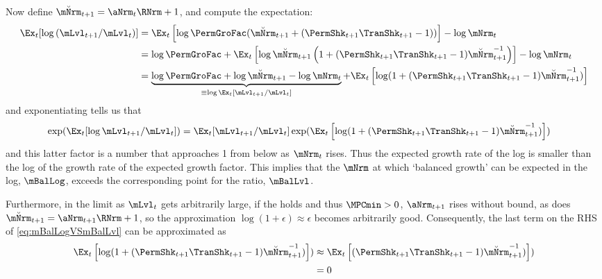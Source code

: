 \documentclass[\econtexRoot/BufferStockTheory]{subfiles}
\begin{document}
Now define $\breve{\mNrm}_{t+1}=\aNrm_{t}\RNrm+1$, and compute the expectation:
\begin{align*}
  \Ex_{t}[\log \left(\mLvl_{t+1}/\mLvl_{t}\right)]
   & = \Ex_{t}\left[\log \PermGroFac (\breve{\mNrm}_{t+1}+(\PermShk_{t+1}\TranShk_{t+1}-1))\right]- \log \mNrm_{t} 
\\ & = \log \PermGroFac + \Ex_{t}\left[\log \breve{\mNrm}_{t+1}\left(1+(\PermShk_{t+1}\TranShk_{t+1}-1)\breve{\mNrm}_{t+1}^{-1}\right)\right]- \log \mNrm_{t} 
\\ & = \underbrace{\log \PermGroFac + \log \breve{\mNrm}_{t+1} - \log \mNrm_{t}}_{\equiv \log \Ex_{t}[\mLvl_{t+1}/\mLvl_{t}]} + \Ex_{t}\left[ \log (1+(\PermShk_{t+1}\TranShk_{t+1}-1)\breve{\mNrm}_{t+1}^{-1})\right]
\end{align*}
and exponentiating tells us that
\begin{equation}\begin{gathered}\begin{aligned}\label{eq:mBalLogVSmBalLvl}
  \exp(\Ex_{t}[\log \mLvl_{t+1}/\mLvl_{t}]) & = \Ex_{t}[\mLvl_{t+1}/\mLvl_{t}]\exp( \Ex_{t}\left[ \log (1+(\PermShk_{t+1}\TranShk_{t+1}-1)\breve{\mNrm}_{t+1}^{-1})\right])
\end{aligned}\end{gathered}\end{equation}
and this latter factor is a number that approaches 1 from below as $\mNrm_{t}$ rises.  Thus the expected growth rate of the log is smaller than the log of the growth rate of the expected growth factor.  This implies that the $\mNrm$ at which `balanced growth' can be expected in the log, $\mBalLog$, exceeds the corresponding point for the ratio, $\mBalLvl$.

Furthermore, in the limit as $\mLvl_{t}$ gets arbitrarily large, if the {\RIC} holds and thus $\MPCmin > 0$, $\aNrm_{t+1}$ rises without bound, as does $\breve{\mNrm}_{t+1}=\aNrm_{t+1}\RNrm+1$, so the approximation $\log (1+\epsilon) \approx \epsilon$ becomes arbitrarily good.  Consequently, the last term on the RHS of \eqref{eq:mBalLogVSmBalLvl} can be approximated as
\begin{align*}
  \Ex_{t}\left[ \log (1+(\PermShk_{t+1}\TranShk_{t+1}-1)\breve{\mNrm}_{t+1}^{-1})\right]) & \approx \Ex_{t}\left[ (\PermShk_{t+1}\TranShk_{t+1}-1)\breve{\mNrm}_{t+1}^{-1})\right])
                                                                                            \\ & = 0
\end{align*}
\end{document}
